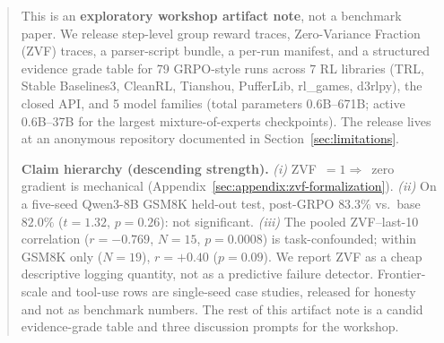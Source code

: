 \begin{abstract}
This is an \textbf{exploratory workshop artifact note}, not a benchmark paper.
We release step-level group reward traces, Zero-Variance Fraction (ZVF)
traces, a parser-script bundle, a per-run manifest, and a structured evidence
grade table for 79 GRPO-style runs across 7 RL libraries (TRL, Stable
Baselines3, CleanRL, Tianshou, PufferLib, rl\_games, d3rlpy), the closed
\tinker{} API, and 5 model families (total parameters 0.6B--671B; active
0.6B--37B for the largest mixture-of-experts checkpoints). The release lives
at an anonymous repository documented in
Section~\ref{sec:limitations}.

\textbf{Claim hierarchy (descending strength).}
\textit{(i)} ZVF~$=1\Rightarrow$~zero gradient is mechanical
(Appendix~\ref{sec:appendix:zvf-formalization}).
\textit{(ii)} On a five-seed Qwen3-8B GSM8K held-out test, post-GRPO
$83.3\%$ vs.\ base $82.0\%$ ($t{=}1.32$, $p{=}0.26$): not significant.
\textit{(iii)} The pooled ZVF--last-10 correlation
($r{=}{-}0.769$, $N{=}15$, $p{=}0.0008$) is task-confounded; within
GSM8K only ($N{=}19$), $r{=}{+}0.40$ ($p{=}0.09$).
We report ZVF as a cheap descriptive logging quantity, not as a
predictive failure detector. Frontier-scale and tool-use rows are
single-seed case studies, released for honesty and not as benchmark numbers.
The rest of this artifact note is a candid evidence-grade table and three
discussion prompts for the workshop.
\end{abstract}
